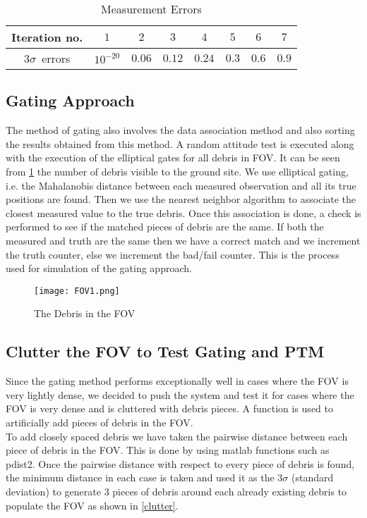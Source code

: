\documentclass[]{aiaa-tc}%
\begin{document}
\begin{table}
\centering
\begin{tabular}[\textwidth]{|c|c|c|c|c|c|c|c|}
\hline
Iteration no. & $1$ & $2$ & $3$ & $4$ & $5$ & $6$ & $7$\\
\hline
$3\sigma$~errors & $10^{-20}$ & $0.06$ & $0.12$ & $0.24$ & $0.3$ & $0.6$ & $0.9$\\
\hline
\end{tabular}
\caption{Measurement Errors}
\end{table}


\subsection{Gating Approach}\label{gating}
The method of gating also involves the data association method and also sorting the results obtained from this method. A random attitude test is executed along with the execution of the elliptical gates for all debris in FOV. It can be seen from \cref{debrisInFOV} the number of debris visible to the ground site. We use elliptical gating, i.e. the Mahalanobis distance between each measured observation and all its true positions are found. Then we use the nearest neighbor  algorithm to associate the closest measured value to the true debris. Once this association is done, a check is performed to see if the matched pieces of debris are the same. If both the measured and truth are the same then we have a correct match and we increment the truth counter, else we increment the bad/fail counter.  This is the process used for simulation of the gating approach.
\begin{figure}[h!]
\centering
\texttt{[image: FOV1.png]}
\caption{The Debris in the FOV}
\label{debrisInFOV}
\end{figure}

\subsection{Clutter the FOV to Test Gating and PTM}

Since the gating method performs exceptionally well in cases where the FOV is very lightly dense, we decided to push the system and test it for cases where the FOV is very dense and is cluttered with debris pieces. A function is used to artificially add pieces of debris in the FOV. \\

To add closely spaced debris we have taken the pairwise distance between each piece of debris in the FOV. This is done by using matlab functions such as pdist2. Once the pairwise distance with respect to every piece of debris is found, the minimum distance in each case is taken and used it as the $3\sigma$ (standard deviation) to generate $3$ pieces of debris around each already existing debris to populate the FOV as shown in \cref{clutter}.\\
\end{document}
